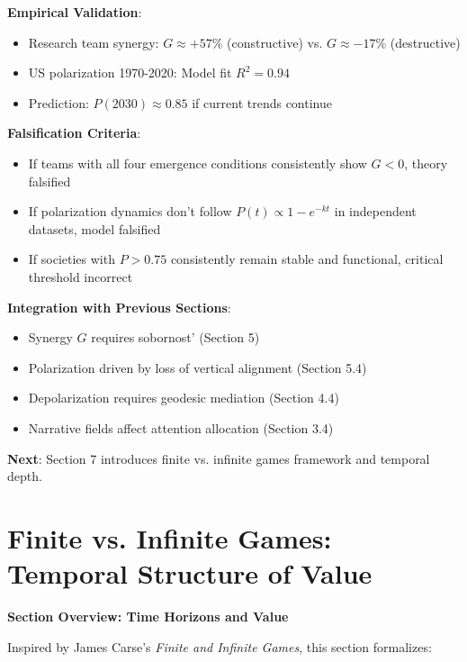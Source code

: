 \documentclass[11pt,a4paper]{article}
\theoremstyle{definition}
\theoremstyle{remark}
\begin{document}
\begin{small}
\begin{enumerate}
\begin{mdframed}[backgroundcolor=green!10,linewidth=2pt,linecolor=green!70!black]
\textbf{Empirical Validation}:
\begin{itemize}[nosep]
    \item Research team synergy: \(G \approx +57\%\) (constructive) vs. \(G \approx -17\%\) (destructive)
    \item US polarization 1970-2020: Model fit \(R^2 = 0.94\)
    \item Prediction: \(P(2030) \approx 0.85\) if current trends continue
\end{itemize}

\textbf{Falsification Criteria}:
\begin{itemize}[nosep]
    \item If teams with all four emergence conditions consistently show \(G < 0\), theory falsified
    \item If polarization dynamics don't follow \(P(t) \propto 1-e^{-kt}\) in independent datasets, model falsified
    \item If societies with \(P > 0.75\) consistently remain stable and functional, critical threshold incorrect
\end{itemize}

\textbf{Integration with Previous Sections}:
\begin{itemize}[nosep]
    \item Synergy \(G\) requires sobornost' (Section 5)
    \item Polarization driven by loss of vertical alignment (Section 5.4)
    \item Depolarization requires geodesic mediation (Section 4.4)
    \item Narrative fields affect attention allocation (Section 3.4)
\end{itemize}

\textbf{Next}: Section 7 introduces finite vs. infinite games framework and temporal depth.
\end{mdframed}


\section{Finite vs. Infinite Games: Temporal Structure of Value}

\begin{mdframed}[backgroundcolor=cyan!5,linewidth=2pt]
\textbf{Section Overview: Time Horizons and Value}

Inspired by James Carse's \textit{Finite and Infinite Games}, this section formalizes:


\end{mdframed}
\end{enumerate}
\end{small}
\end{document}
